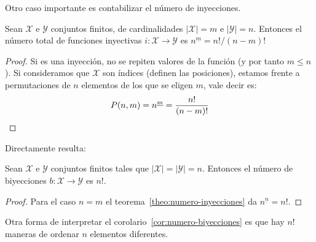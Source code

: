   Otro caso importante es contabilizar el número de inyecciones.
  \begin{theorem}
    \label{theo:numero-inyecciones}
    Sean \(\mathcal{X}\) e \(\mathcal{Y}\) conjuntos finitos,
    de cardinalidades \(\lvert \mathcal{X} \rvert = m\)
    e \(\lvert \mathcal{Y} \rvert = n\).
    Entonces el número total de funciones inyectivas
    \(i \colon \mathcal{X} \rightarrow \mathcal{Y}\)
    es \(n^{\underline{m}} = n! / (n - m)!\)
  \end{theorem}
  \begin{proof}
    Si es una inyección,
    no se repiten valores de la función
    (y por tanto \(m \le n\)).
    Si consideramos que \(\mathcal{X}\) son índices
    (definen las posiciones),
    estamos frente a permutaciones de \(n\) elementos
    de los que se eligen \(m\),
    vale decir es:
    \begin{equation*}
      P(n, m)
	= n^{\underline{m}}
	= \frac{n!}{(n - m)!}
      \qedhere
    \end{equation*}
  \end{proof}
  Directamente resulta:
  \begin{corollary}
    \label{cor:numero-biyecciones}
    Sean \(\mathcal{X}\) e \(\mathcal{Y}\) conjuntos finitos
    tales que
      \(\lvert \mathcal{X} \rvert = \lvert \mathcal{Y} \rvert = n\).
    Entonces el número de biyecciones
      \(b \colon \mathcal{X} \rightarrow \mathcal{Y}\)
    es \(n!\).
  \end{corollary}
  \begin{proof}
    Para el caso \(n = m\)
    el teorema~\ref{theo:numero-inyecciones}
    da \(n^{\underline{n}} = n!\).
  \end{proof}

  Otra forma de interpretar
  el corolario~\ref{cor:numero-biyecciones}
  es que hay \(n!\) maneras de ordenar \(n\) elementos diferentes.

